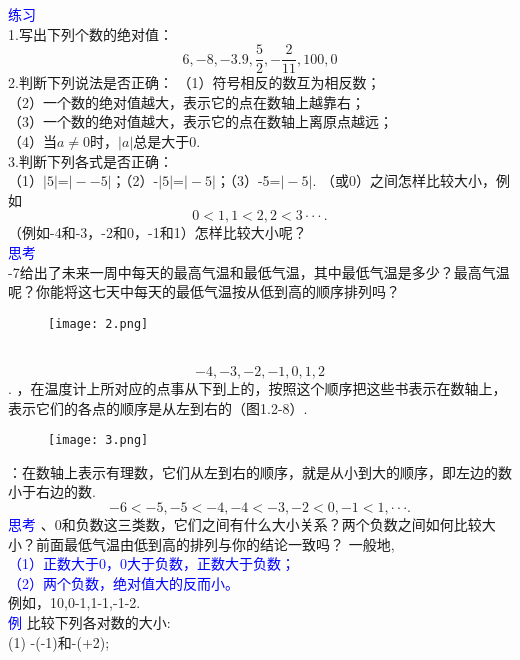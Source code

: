\documentclass[UTF8]{article}
\begin{document}
	\textcolor{blue}{\heiti 练习}\\
	1.写出下列个数的绝对值：\\
	$$6,-8,-3.9,\frac{5}{2},-\frac{2}{11},100,0$$
	2.判断下列说法是否正确：
	\indent（1）符号相反的数互为相反数；\\
	\indent（2）一个数的绝对值越大，表示它的点在数轴上越靠右；\\
	\indent（3）一个数的绝对值越大，表示它的点在数轴上离原点越远；\\
	\indent（4）当$a\neq0$时，$\vert a \vert$总是大于0.\\
	3.判断下列各式是否正确：\\
	（1）$\vert 5 \vert$=$\vert --5 \vert$；（2）-$\vert 5 \vert$=$\vert -5 \vert$；（3）-5=$\vert -5 \vert$.
	（或0）之间怎样比较大小，例如\\
	$$0<1,1<2,2<3···.$$
	（例如-4和-3，-2和0，-1和1）怎样比较大小呢？\\
	\textcolor{blue}{\heiti 思考}\\
	-7给出了未来一周中每天的最高气温和最低气温，其中最低气温是多少？最高气温呢？你能将这七天中每天的最低气温按从低到高的顺序排列吗？\\
	\begin{figure}[ht]
		\centering
		\texttt{[image: 2.png]}
	\end{figure}
	\\
	$$-4,-3,-2,-1,0,1,2$$.
	，在温度计上所对应的点事从下到上的，按照这个顺序把这些书表示在数轴上，表示它们的各点的顺序是从左到右的（图1.2-8）.
	\begin{figure}[ht]
		\centering
		\texttt{[image: 3.png]}
	\end{figure}
	：在数轴上表示有理数，它们从左到右的顺序，就是从小到大的顺序，即左边的数小于右边的数.
	$$-6<-5,-5<-4,-4<-3,-2<0,-1<1,···.$$
	\textcolor{blue}{思考}
	、0和负数这三类数，它们之间有什么大小关系？两个负数之间如何比较大小？前面最低气温由低到高的排列与你的结论一致吗？
	一般地,\\
	\textcolor{blue}{（1）正数大于0，0大于负数，正数大于负数；}\\
	\textcolor{blue}{（2）两个负数，绝对值大的反而小。}\\
	例如，10,0-1,1-1,-1-2.\\
	\textcolor{blue}{例} 比较下列各对数的大小:\\
	(1) -(-1)和-(+2); \\
\end{document}
